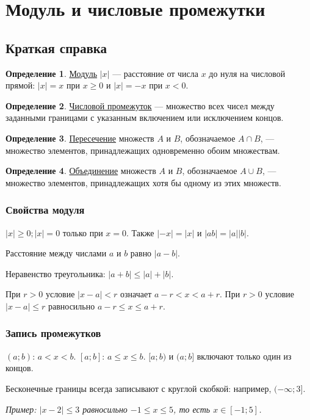 \documentclass[12pt,a4paper]{article}
\theoremstyle{definition}
\newtheorem{definition}{Определение}[section]
\theoremstyle{plain}
\theoremstyle{remark}
\newcommand{\term}[1]{\uline{#1}}
\begin{document}
\section{Модуль и числовые промежутки}
\subsection*{Краткая справка}
\begin{definition}\term{Модуль} \(| x |\) — расстояние от числа \(x\) до нуля на числовой прямой: \(| x | = x\) при \(x \ge  0\) и \(| x | = - x\) при \(x < 0\).\end{definition}
\begin{definition}\term{Числовой промежуток} — множество всех чисел между заданными границами с указанным включением или исключением концов.\end{definition}
\begin{definition}\term{Пересечение} множеств \(A\) и \(B\), обозначаемое \(A\cap B\), — множество элементов, принадлежащих одновременно обоим множествам.\end{definition}
\begin{definition}\term{Объединение} множеств \(A\) и \(B\), обозначаемое \(A\cup B\), — множество элементов, принадлежащих хотя бы одному из этих множеств.\end{definition}
\subsubsection*{Свойства модуля}
\(| x | \ge  0;\allowbreak | x | = 0\) только при \(x = 0\). Также \(| - x | = | x |\) и \(| ab | = | a | | b |\).\par
Расстояние между числами \(a\) и \(b\) равно \(| a - b |\).\par
Неравенство треугольника: \(| a + b | \le  | a | + | b |\).\par
При \(r > 0\) условие \(| x - a | < r\) означает \(a - r < x < a + r\). При \(r>0\) условие \(|x-a|\le r\) равносильно \(a-r\le x\le a+r\).\par
\subsubsection*{Запись промежутков}
\((a;\allowbreak b)\): \(a < x < b\). \([a;\allowbreak b]\): \(a \le x \le b\). \([a;\allowbreak b)\) и \((a;\allowbreak b]\) включают только один из концов.\par
Бесконечные границы всегда записывают с круглой скобкой: например, \((- \infty ;\allowbreak 3]\).\par
{\small\textit{Пример: \(| x - 2 | \le  3\) равносильно \(- 1 \le  x \le  5\), то есть \(x \in  [- 1;\allowbreak 5]\).}}\par
\end{document}
